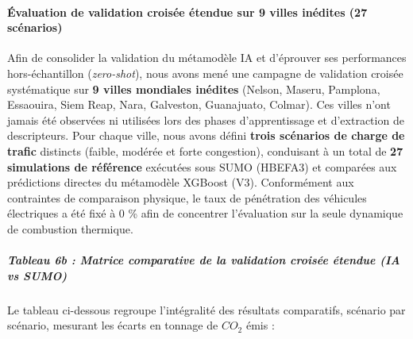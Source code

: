 \documentclass[10pt, a4paper]{article}
\begin{document}
\paragraph{Évaluation de validation croisée étendue sur 9 villes
inédites (27
scénarios)}\label{uxe9valuation-de-validation-croisuxe9e-uxe9tendue-sur-9-villes-inuxe9dites-27-scuxe9narios}

Afin de consolider la validation du métamodèle IA et d'éprouver ses
performances hors-échantillon (\emph{zero-shot}), nous avons mené une
campagne de validation croisée systématique sur \textbf{9 villes
mondiales inédites} (Nelson, Maseru, Pamplona, Essaouira, Siem Reap,
Nara, Galveston, Guanajuato, Colmar). Ces villes n'ont jamais été
observées ni utilisées lors des phases d'apprentissage et d'extraction
de descripteurs. Pour chaque ville, nous avons défini \textbf{trois
scénarios de charge de trafic} distincts (faible, modérée et forte
congestion), conduisant à un total de \textbf{27 simulations de
référence} exécutées sous SUMO (HBEFA3) et comparées aux prédictions
directes du métamodèle XGBoost (V3). Conformément aux contraintes de
comparaison physique, le taux de pénétration des véhicules électriques a
été fixé à 0 \% afin de concentrer l'évaluation sur la seule dynamique
de combustion thermique.

\subparagraph{Tableau 6b : Matrice comparative de la validation croisée
étendue (IA vs
SUMO)}\label{tableau-6b-matrice-comparative-de-la-validation-croisuxe9e-uxe9tendue-ia-vs-sumo}

Le tableau ci-dessous regroupe l'intégralité des résultats comparatifs,
scénario par scénario, mesurant les écarts en tonnage de \(CO_2\) émis :
\end{document}
